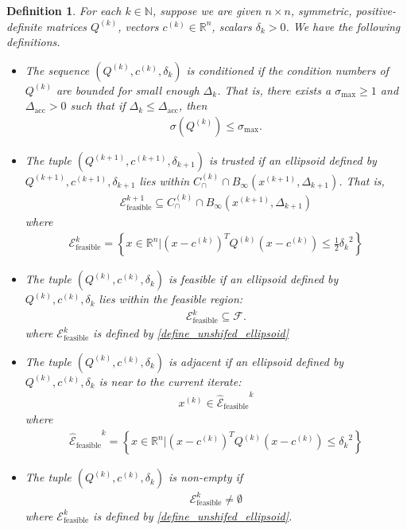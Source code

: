 \documentclass{article}
\newtheorem{definition}[theorem]{Definition}
\theoremstyle{case}
\numberwithin{theorem}{subsection}
\newcommand{\capcones}{{C^{(k)}_{\cap}}}
\newcommand{\ck}{{c^{(k)}}}
\newcommand{\dacc}{{\Delta_{\textrm{acc}}}}
\newcommand{\dk}{\Delta_k}
\newcommand{\dkpo}{\Delta_{k+1}}
\newcommand{\feasible}{{\mathcal F}}
\newcommand{\naturals}{\mathbb N}
\newcommand{\qk}{{Q^{(k)}}}
\newcommand{\Rn}{\mathbb R^n}
\newcommand{\scaledunshiftedellipsoid}{{{\mathcal {\hat E}_{\text{feasible}}}^k}}
\newcommand{\sdk}{{\delta_k}}
\newcommand{\sigmamax}{{\sigma_{\textrm{max}}}}
\newcommand{\trkpo}{{ B_{\infty}\left(\xkpo, \dkpo\right) }}
\newcommand{\unshiftedellipsoid}{{\mathcal E^k_{\textrm{feasible}}}}
\newcommand{\xkpo}{{{x}^{(k+1)}}}
\newcommand{\xk}{x^{(k)}}
\newcommand{\qkpo}{{Q^{(k+1)}}}
\newcommand{\ckpo}{{c^{(k+1)}}}
\newcommand{\sdkpo}{{\delta_{k+1}}}
\newcommand{\unshiftedellipsoidkpo}{{\mathcal E^{k+1}_{\textrm{feasible}}}}
\begin{document}
\begin{definition}
\label{ellipsoids_notation_definitions}
For each $k \in \naturals$, suppose we are given $n\times n$, symmetric, positive-definite matrices $\qk$, vectors $\ck \in \Rn$, scalars $\sdk > 0$.
We have the following definitions.
\begin{itemize}
\item The sequence $(\qk, \ck, \sdk)$ is \emph{conditioned} if the condition numbers of $\qk$ are bounded for small enough $\dk$.
That is, there exists a $\sigmamax \ge 1$ and $\dacc > 0$ such that if $\dk \le \dacc$, then
\begin{align}
\sigma\left(Q^{(k)}\right) \le \sigmamax. \label{define_suitable_condition_numbers}
\end{align}
\item The tuple $(\qkpo, \ckpo, \sdkpo)$ is \emph{trusted} if an ellipsoid defined by $\qkpo, \ckpo, \sdkpo$ lies within $ \capcones \cap \trkpo $.
That is,
\begin{align}
\unshiftedellipsoidkpo \subseteq \capcones \cap \trkpo  \label{define_suitable_in_tr}
\end{align}
where
\begin{align}
\unshiftedellipsoid = \left\{x \in \Rn | \left(x - \ck \right)^T \qk \left(x - \ck\right) \le \frac 1 2 {\sdk}^2 \right\} \label{define_unshifed_ellipsoid}
\end{align}
\item The tuple $(\qk, \ck, \sdk)$ is \emph{feasible} if an ellipsoid defined by $\qk, \ck, \sdk$ lies within the feasible region:
\begin{align}
\unshiftedellipsoid \subseteq \feasible.
\end{align}
where $\unshiftedellipsoid$ is defined by \cref{define_unshifed_ellipsoid}
\item The tuple $(\qk, \ck, \sdk)$ is \emph{adjacent} if an ellipsoid defined by $\qk, \ck, \sdk$ is near to the current iterate:
\begin{align}
\xk \in \scaledunshiftedellipsoid \label{define_suitable_close_to_iterate}
\end{align}
where
\begin{align}
\scaledunshiftedellipsoid = \left\{x \in \Rn | \left(x - \ck\right)^T \qk \left(x - \ck\right) \le {\sdk}^2 \right\} \label{define_scaledunshiftedellipsoid}
\end{align}
\item The tuple $(\qk, \ck, \sdk)$ is \emph{non-empty} if
\begin{align}
\unshiftedellipsoid \ne \emptyset
\end{align}
where $\unshiftedellipsoid$ is defined by \cref{define_unshifed_ellipsoid}.
\end{itemize}
\end{definition}
\end{document}
